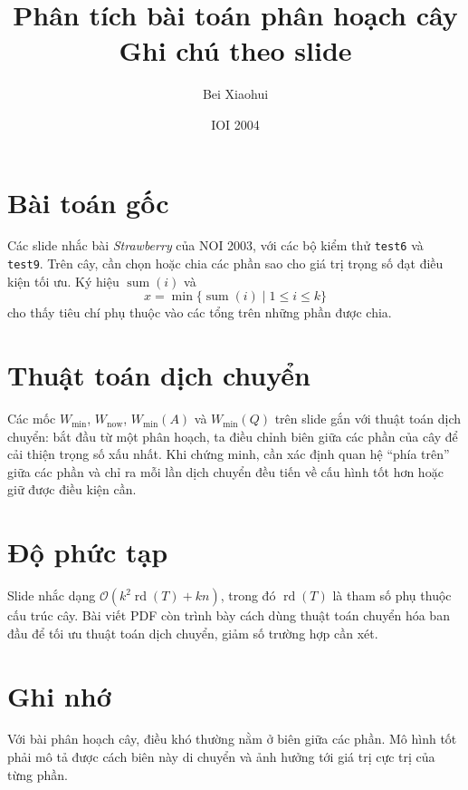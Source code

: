 \documentclass[11pt]{article}
\title{Phân tích bài toán phân hoạch cây\\{\large Ghi chú theo slide}}
\author{Bei Xiaohui}
\date{IOI 2004}
\newcommand{\Oh}{\mathcal{O}}
\begin{document}
\maketitle


\section{Bài toán gốc}

Các slide nhắc bài \emph{Strawberry} của NOI 2003, với các bộ kiểm thử
\texttt{test6} và \texttt{test9}. Trên cây, cần chọn hoặc chia các phần sao
cho giá trị trọng số đạt điều kiện tối ưu. Ký hiệu \(\operatorname{sum}(i)\)
và
\[
  x=\min\{\operatorname{sum}(i)\mid 1\le i\le k\}
\]
cho thấy tiêu chí phụ thuộc vào các tổng trên những phần được chia.

\section{Thuật toán dịch chuyển}

Các mốc \(W_{\min}\), \(W_{\mathrm{now}}\), \(W_{\min}(A)\) và
\(W_{\min}(Q)\) trên slide gắn với thuật toán dịch chuyển: bắt đầu từ một
phân hoạch, ta điều chỉnh biên giữa các phần của cây để cải thiện trọng số
xấu nhất. Khi chứng minh, cần xác định quan hệ ``phía trên'' giữa các phần
và chỉ ra mỗi lần dịch chuyển đều tiến về cấu hình tốt hơn hoặc giữ được
điều kiện cần.

\section{Độ phức tạp}

Slide nhắc dạng \(\Oh(k^2\operatorname{rd}(T)+kn)\), trong đó
\(\operatorname{rd}(T)\) là tham số phụ thuộc cấu trúc cây. Bài viết PDF còn
trình bày cách dùng thuật toán chuyển hóa ban đầu để tối ưu thuật toán dịch
chuyển, giảm số trường hợp cần xét.

\section{Ghi nhớ}

Với bài phân hoạch cây, điều khó thường nằm ở biên giữa các phần. Mô hình tốt
phải mô tả được cách biên này di chuyển và ảnh hưởng tới giá trị cực trị của
từng phần.
\end{document}
